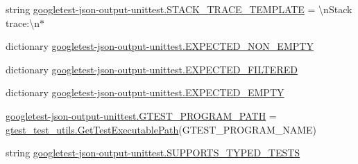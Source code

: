 \begin{DoxyCompactItemize}
string \mbox{\hyperlink{namespacegoogletest-json-output-unittest_aad22fa1a2c6606dc4914336e1be8abb9}{googletest-\/json-\/output-\/unittest.\+S\+T\+A\+C\+K\+\_\+\+T\+R\+A\+C\+E\+\_\+\+T\+E\+M\+P\+L\+A\+TE}} = \textquotesingle{}\textbackslash{}n\+Stack trace\+:\textbackslash{}n$\ast$\textquotesingle{}
\item 
dictionary \mbox{\hyperlink{namespacegoogletest-json-output-unittest_a558a6c2af202fbbad4bcc27f4c05c700}{googletest-\/json-\/output-\/unittest.\+E\+X\+P\+E\+C\+T\+E\+D\+\_\+\+N\+O\+N\+\_\+\+E\+M\+P\+TY}}
\item 
dictionary \mbox{\hyperlink{namespacegoogletest-json-output-unittest_ab26a4eac32a5edbebfe692ebb45286b2}{googletest-\/json-\/output-\/unittest.\+E\+X\+P\+E\+C\+T\+E\+D\+\_\+\+F\+I\+L\+T\+E\+R\+ED}}
\item 
dictionary \mbox{\hyperlink{namespacegoogletest-json-output-unittest_af895388d271e081833e8fe5a2e441a3d}{googletest-\/json-\/output-\/unittest.\+E\+X\+P\+E\+C\+T\+E\+D\+\_\+\+E\+M\+P\+TY}}
\item 
\mbox{\hyperlink{namespacegoogletest-json-output-unittest_a14a7165c04f407b3355881c3574a5492}{googletest-\/json-\/output-\/unittest.\+G\+T\+E\+S\+T\+\_\+\+P\+R\+O\+G\+R\+A\+M\+\_\+\+P\+A\+TH}} = \mbox{\hyperlink{namespacegtest__test__utils_a89ed3717984a80ffbb7a9c92f71b86a2}{gtest\+\_\+test\+\_\+utils.\+Get\+Test\+Executable\+Path}}(G\+T\+E\+S\+T\+\_\+\+P\+R\+O\+G\+R\+A\+M\+\_\+\+N\+A\+ME)
\item 
string \mbox{\hyperlink{namespacegoogletest-json-output-unittest_a8e55aed21c8823df35607daf335c4962}{googletest-\/json-\/output-\/unittest.\+S\+U\+P\+P\+O\+R\+T\+S\+\_\+\+T\+Y\+P\+E\+D\+\_\+\+T\+E\+S\+TS}}
\end{DoxyCompactItemize}
